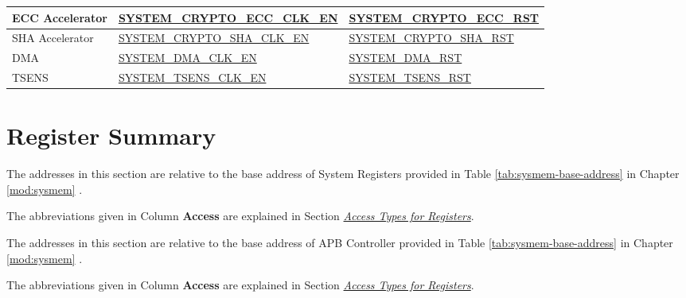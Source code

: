 \documentclass[main\_\_EN.tex]{subfiles}
\begin{document}
\begin{ThreePartTable}
\begin{longtable}[c]{ |l|l|l| }
    ECC Accelerator & \hyperref[fielddesc:SYSTEMCRYPTOECCCLKEN]{SYSTEM\_CRYPTO\_ECC\_CLK\_EN} & \hyperref[fielddesc:SYSTEMCRYPTOECCRST]{SYSTEM\_CRYPTO\_ECC\_RST} \\\hline
    SHA Accelerator & \hyperref[fielddesc:SYSTEMCRYPTOSHACLKEN]{SYSTEM\_CRYPTO\_SHA\_CLK\_EN} & \hyperref[fielddesc:SYSTEMCRYPTOSHARST]{SYSTEM\_CRYPTO\_SHA\_RST} \\\hline
    DMA & \hyperref[fielddesc:SYSTEMDMACLKEN]{SYSTEM\_DMA\_CLK\_EN} & \hyperref[fielddesc:SYSTEMDMARST]{SYSTEM\_DMA\_RST}\tnote{5}  \\\hline
    TSENS & \hyperref[fielddesc:SYSTEMTSENSCLKEN]{SYSTEM\_TSENS\_CLK\_EN} & \hyperref[fielddesc:SYSTEMTSENSRST]{SYSTEM\_TSENS\_RST} \\\hline

\end{longtable}
\end{ThreePartTable}




\clearpage
\section{Register Summary}
\label{sec:sysreg-reg-summ}
\hypertarget{sysreg-reg-summ}{}

The addresses in this section are relative to the base address of System Registers provided in Table \ref{tab:sysmem-base-address} in Chapter \ref{mod:sysmem} \textit{}.

The abbreviations given in Column \textbf{Access} are explained in Section \hyperref[glossary-access-types]{\textit{Access Types for Registers}}.



The addresses in this section are relative to the base address of APB Controller provided in Table \ref{tab:sysmem-base-address} in Chapter \ref{mod:sysmem} \textit{}.

The abbreviations given in Column \textbf{Access} are explained in Section \hyperref[glossary-access-types]{\textit{Access Types for Registers}}.
\end{document}
